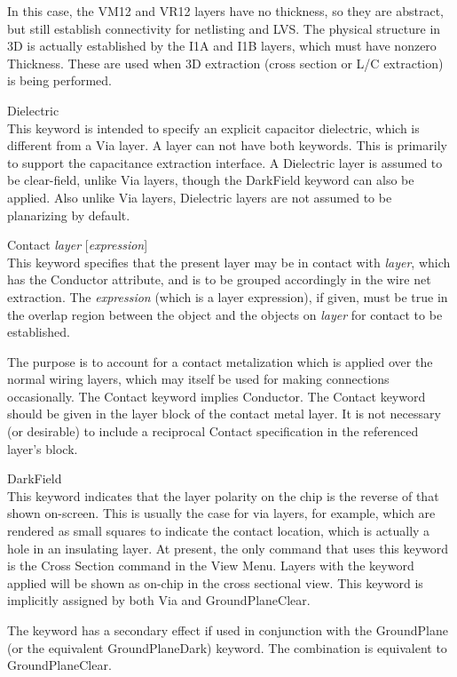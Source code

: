 \begin{description}
In this case, the {\vt VM12} and {\vt VR12} layers have no
thickness, so they are abstract, but still establish
connectivity for netlisting and LVS.  The physical structure
in 3D is actually established by the {\vt I1A} and {\vt I1B}
layers, which must have nonzero {\et Thickness}.  These are
used when 3D extraction (cross section or L/C extraction) is
being performed.

\item{\et Dielectric}\\
This keyword is intended to specify an explicit capacitor dielectric,
which is different from a {\vt Via} layer.  A layer can not have both
keywords.  This is primarily to support the capacitance extraction
interface.  A {\vt Dielectric} layer is assumed to be clear-field,
unlike {\vt Via} layers, though the {\vt DarkField} keyword can also
be applied.  Also unlike {\vt Via} layers, {\vt Dielectric} layers are
not assumed to be planarizing by default.

\item{\et Contact} {\it layer} [{\it expression\/}]\\
This keyword specifies that the present layer may be in contact with
{\it layer}, which has the {\et Conductor} attribute, and is to be
grouped accordingly in the wire net extraction.  The {\it expression}
(which is a layer expression), if given, must be true in the overlap
region between the object and the objects on {\it layer} for contact
to be established.

The purpose is to account for a contact metalization which is applied
over the normal wiring layers, which may itself be used for making
connections occasionally.  The {\et Contact} keyword implies {\et
Conductor}.  The {\et Contact} keyword should be given in the layer
block of the contact metal layer.  It is not necessary (or desirable)
to include a reciprocal {\et Contact} specification in the referenced
layer's block.

\item{\et DarkField}\\
This keyword indicates that the layer polarity on the chip is the
reverse of that shown on-screen.  This is usually the case for via
layers, for example, which are rendered as small squares to indicate
the contact location, which is actually a hole in an insulating layer. 
At present, the only command that uses this keyword is the {\cb Cross
Section} command in the {\cb View Menu}.  Layers with the keyword
applied will be shown as on-chip in the cross sectional view.
This keyword is implicitly assigned by both {\et Via} and
{\et GroundPlaneClear}.

The keyword has a secondary effect if used in conjunction with the
{\et GroundPlane} (or the equivalent {\et GroundPlaneDark}) keyword. 
The combination is equivalent to {\et GroundPlaneClear}.
\end{description}


